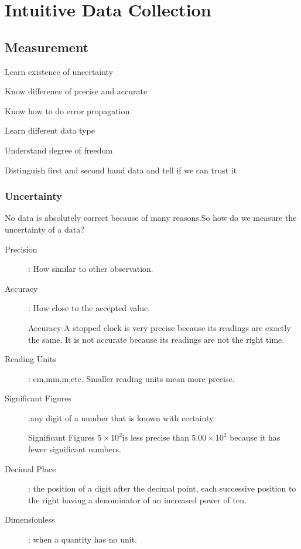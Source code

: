 \section{Intuitive Data Collection}

\subsection{Measurement}
\begin{objectives}
    \item Learn existence of uncertainty
    \item Know difference of precise and accurate
    \item Know how to do error propagation
    \item Learn different data type
    \item Understand degree of freedom
    \item Distinguish first and second hand data and tell if we can trust it
\end{objectives}
\subsubsection{Uncertainty}
 No data is absolutely correct because of many reasons.So how do we measure the uncertainty of a data? 
 \begin{description} 
    \item[Precision]: How similar to other observation.
    \item[Accuracy]: How close to the accepted value.\\
    \begin{examplebox}{Accuracy}
    A stopped clock is very precise because its readings are exactly the same. It is not accurate because its readings are not the right time.
    \end{examplebox}
    
    \item[Reading Units]: cm,mm,m,etc.
 Smaller reading units mean more precise.   \item[Significant Figures]:any digit of a number that is known with certainty.\\
 \begin{examplebox}{Significant Figures}
 \(5 \times 10^2\)is less precise than \(5.00 \times 10^2\) because it has fewer significant numbers.
 \end{examplebox}
  
    \item[Decimal Place]: the position of a digit after the decimal point, each successive position to the right having a denominator of an increased power of ten.
    \item[Dimensionless]: when a quantity has no unit.
\end{description}


